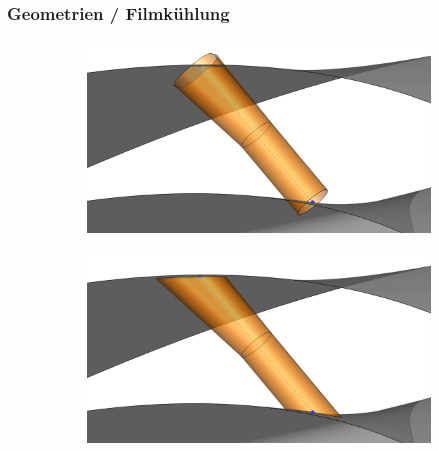 \documentclass[8pt, aspectratio=169]{beamer}
\begin{document}
\begin{frame}
	\frametitle{Geometrien / Filmkühlung}
	\vspace{0cm}
	\centering
	\begin{minipage}[t]{\textwidth}
		\begin{figure}[H]
			\centering
			\begin{subfigure}{.45\textwidth}
				\includegraphics[width=\textwidth]{../../tec/holes/20edit.png}
			\end{subfigure}
			\phantom{aaa}
			\begin{subfigure}{.45\textwidth}
				\includegraphics[width=\textwidth]{../../tec/holes/21edit.png}
			\end{subfigure}
		\end{figure}
	\end{minipage}
	\vfill
\end{frame}
\end{document}
